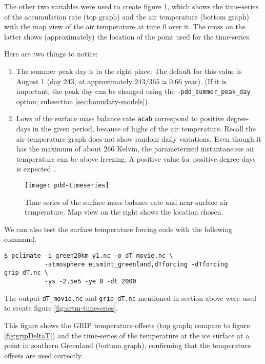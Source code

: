 The other two variables were used to create figure \ref{fig:pddseries}, which
shows the time-series of the accumulation rate (top graph) and the air
temperature (bottom graph) with the map view of the air temperature at time 0
over it. The cross on the latter shows (approximately) the location of the
point used for the time-series.

Here are two things to notice:
\begin{enumerate}
\item The summer peak day is in the right place.  The default for this value is
  August 1 (day $243$, at approximately $243/365 \simeq 0.66$ year).  (If it is
  important, the peak day can be changed using the \texttt{-pdd_summer_peak_day}
  option; subsection \ref{sec:boundary-models}).

\item Lows of the surface mass balance rate \texttt{acab} correspond to 
  positive degree-days in the given period, because of highs of the air
  temperature.  Recall the air temperature graph does
  not show random daily variations.  Even though it has the maximum of about $266$
  Kelvin, the parameterized instantaneous air temperature can be above freezing.
  A positive value for positive degree-days is expected \cite{CalovGreve05}.
\end{enumerate}

\begin{figure}[ht]
  \centering
  \texttt{[image: pdd-timeseries]}
  \caption{Time series of the surface mass balance rate and near-surface air temperature. Map view 
           on the right shows the location chosen.}
  \label{fig:pddseries}
\end{figure}

\bigskip
We can also test the surface temperature forcing code with the following command.
\begin{verbatim}
$ pclimate -i green20km_y1.nc -o dT_movie.nc \
           -atmosphere eismint_greenland,dTforcing -dTforcing grip_dT.nc \
           -ys -2.5e5 -ye 0 -dt 2000
\end{verbatim}%
The output \texttt{dT_movie.nc} and \texttt{grip_dT.nc} mentioned in section above were used to create figure \ref{fig:artm-timeseries}.

This figure shows the GRIP temperature offsets (top graph; compare to figure \ref{fig:gripDeltaT}) and the time-series of the temperature at the ice surface at a point in southern Greenland (bottom graph), confirming that the temperature offsets are used correctly.

